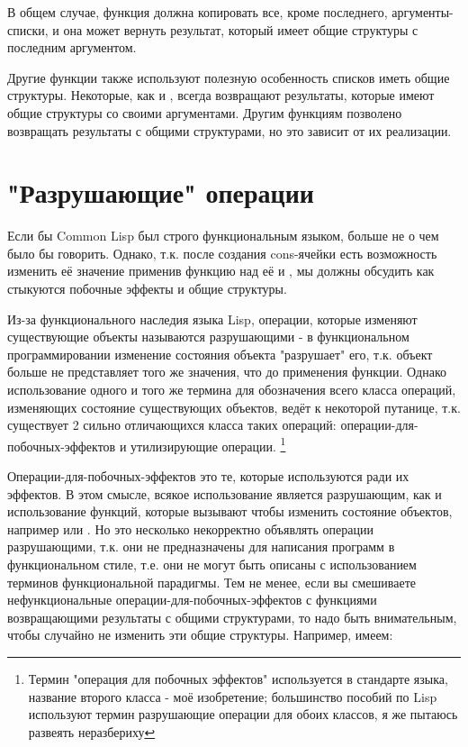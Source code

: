 
В общем случае, функция  должна копировать все, кроме последнего,
аргументы-списки, и она может вернуть результат, который имеет общие структуры с последним
аргументом.

Другие функции также используют полезную особенность списков иметь общие
структуры. Некоторые, как и , всегда возвращают результаты, которые имеют
общие структуры со своими аргументами. Другим функциям позволено возвращать результаты с
общими структурами, но это зависит от их реализации.

\section{"Разрушающие" операции}

Если бы Common Lisp был строго функциональным языком, больше не о чем было бы
говорить. Однако, т.к. после создания cons-ячейки есть возможность изменить её значение
применив функцию  над её  и , мы должны обсудить как
стыкуются побочные эффекты и общие структуры.

Из-за функционального наследия языка Lisp, операции, которые изменяют существующие объекты
называются разрушающими - в функциональном программировании изменение состояния объекта
"разрушает" его, т.к. объект больше не представляет того же значения, что до применения
функции. Однако использование одного и того же термина для обозначения всего класса
операций, изменяющих состояние существующих объектов, ведёт к некоторой путанице,
т.к. существует 2 сильно отличающихся класса таких операций:
операции-для-побочных-эффектов и утилизирующие операции. \footnote{Термин "операция для
  побочных эффектов" используется в стандарте языка, название второго класса - моё
  изобретение; большинство пособий по Lisp используют термин разрушающие операции для
  обоих классов, я же пытаюсь развеять неразбериху}

Операции-для-побочных-эффектов это те, которые используются ради их эффектов. В этом
смысле, всякое использование  является разрушающим, как и использование
функций, которые вызывают  чтобы изменить состояние объектов, например
 или . Но это несколько некорректно объявлять операции
разрушающими, т.к. они не предназначены для написания программ в функциональном стиле,
т.е. они не могут быть описаны с использованием терминов функциональной парадигмы. Тем не
менее, если вы смешиваете нефункциональные операции-для-побочных-эффектов с функциями
возвращающими результаты с общими структурами, то надо быть внимательным, чтобы случайно
не изменить эти общие структуры. Например, имеем:

